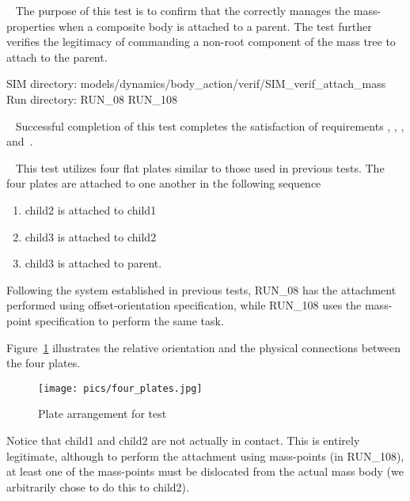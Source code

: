\label{test:mass_08}
\begin{description}
\item[Purpose:] \ \newline
The purpose of this test is to confirm that the \ModelDesc correctly manages
the mass-properties when a composite body is attached to a parent.  The test further verifies the legitimacy of commanding a non-root component of the mass tree to attach to the parent.

\item SIM directory:
models/dynamics/body\_action/verif/SIM\_verif\_attach\_mass\\
Run directory: RUN\_08 RUN\_108

\item[Requirements:] \ \newline
Successful completion of this test completes the satisfaction of
requirements , ,
, and~.

\item[Procedure:]\ \newline
This test utilizes four flat plates similar to those used in previous
tests.  The four plates are attached to one another in the following sequence
\begin{enumerate}
 \item child2 is attached to child1
 \item child3 is attached to child2
 \item child3 is attached to parent.
\end{enumerate}

Following the system established in previous tests, RUN\_08 has the attachment
performed using offset-orientation specification, while RUN\_108 uses the
mass-point specification to perform the same task.

Figure~\ref{fig:four_plates} illustrates the relative orientation and the
physical connections between the four plates.

\begin{figure}[h]
\begin{center}
\texttt{[image: pics/four\_plates.jpg]}
\caption{Plate arrangement for test}
\label{fig:four_plates}
\end{center}
\end{figure}

Notice that child1 and child2 are not actually in contact.  This is entirely
legitimate, although to perform the attachment using mass-points (in
RUN\_108), at least one of the mass-points must be dislocated from the actual
mass body (we arbitrarily chose to do this to child2).


\end{description}
